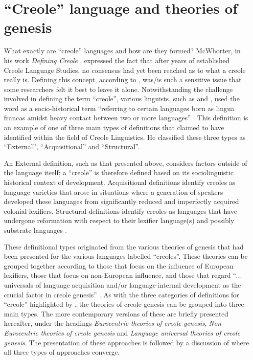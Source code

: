  
 \section {``Creole'' language and theories of genesis}\label{2.2}
What exactly are ``creole'' languages and how are they formed? McWhorter, in his work \emph {Defining Creole} \citep{McWhorter05}, expressed the fact that after years of established Creole Language Studies, no consensus had yet been reached as to what a creole really is. Defining this concept, according to  \citet{McWhorter05}, was/is such a sensitive issue that some researchers felt it best to leave it alone. Notwithstanding the challenge involved in defining the term ``creole'', various linguists, such as \citet{Kihm80} and \citet{Chaudenson92}, used the word as a socio-historical term ``referring to certain languages born as lingua francas amidst heavy contact between two or more languages'' \citep[9]{McWhorter05}. This definition is an example of one of three main types of definitions that \citet{Hickey97} claimed to have identified within the field of Creole Linguistics. He classified these three types as ``External'', ``Acquisitional'' and ``Structural''.

An External definition, such as that presented above, considers factors outside of the language itself; a ``creole'' is therefore defined based on its sociolinguistic historical context of development. Acquisitional definitions identify creoles as language varieties that arose in situations where a generation of speakers developed these languages from significantly reduced and imperfectly acquired colonial lexifiers. Structural definitions identify creoles as languages that have undergone reformation with respect to their lexifier language(s) and possibly substrate languages \citep{Hickey97}.

These definitional types originated from the various theories of genesis that had been presented for the various languages labelled ``creoles''. These theories can be grouped together according to those that focus on the influence of European lexifiers, those that focus on non-European influence, and those that regard ``... universals of language acquisition and/or language-internal development as the crucial factor in creole genesis'' \citep[3]{Braun09}. As with the three categories of definitions for ``creole'' highlighted by  \citet{Hickey97}, the theories of creole genesis can be grouped into three main types. The more contemporary versions of these are briefly presented hereafter, under the headings \emph{Eurocentric theories of creole genesis}, \emph{Non-Eurocentric theories of creole genesis} and \emph{Language universal theories of creole genesis}. The presentation of these approaches is followed by a discussion of where all three types of approaches converge.

